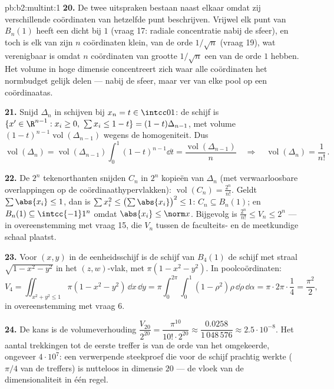 \begin{solution}{pb:b2:multint:1}
\textbf{20.} De twee uitspraken bestaan naast elkaar omdat zij
verschillende coördinaten van hetzelfde punt beschrijven. Vrijwel
elk punt van $B_n(1)$ heeft een  dicht bij $1$ (vraag 17:
radiale concentratie nabij de sfeer), en toch is elk van zijn $n$
coördinaten klein, van de orde $1/\sqrt n$ (vraag 19), wat
verenigbaar is omdat $n$ coördinaten van grootte $1/\sqrt n$ een
 van de orde $1$ hebben. Het volume in hoge dimensie
concentreert zich waar alle coördinaten het normbudget gelijk
delen --- nabij de sfeer, maar ver van elke pool op een
coördinaatas.

\textbf{21.} Snijd $\Delta_n$ in schijven bij $x_n = t \in
\intcc01$: de schijf is $\{x' \in \R^{n-1} : x_i \geq 0,\ \sum x_i
\leq 1 - t\} = (1-t)\Delta_{n-1}$, met volume
$(1-t)^{n-1}\operatorname{vol}(\Delta_{n-1})$ wegens de
homogeniteit. Dus
\[
\operatorname{vol}(\Delta_n) =
\operatorname{vol}(\Delta_{n-1})\int_0^1(1 - t)^{n-1}\dd t =
\frac{\operatorname{vol}(\Delta_{n-1})}{n}
\quad\Longrightarrow\quad
\operatorname{vol}(\Delta_n) = \frac1{n!}\,.
\]

\textbf{22.} De $2^n$ tekenorthanten snijden $C_n$ in $2^n$ kopieën
van $\Delta_n$ (met verwaarloosbare overlappingen op de
coördinaathypervlakken): $\operatorname{vol}(C_n) =
\frac{2^n}{n!}$. Geldt $\sum\abs{x_i} \leq 1$, dan is $\sum x_i^2
\leq \bigl(\sum\abs{x_i}\bigr)^2 \leq 1$: $C_n \subseteq B_n(1)$;
en $B_n(1) \subseteq \intcc{-1}1^n$ omdat $\abs{x_i} \leq \norm x$.
Bijgevolg is $\frac{2^n}{n!} \leq V_n \leq 2^n$ --- in
overeenstemming met vraag 15, die $V_n$ tussen de faculteits- en de
meetkundige schaal plaatst.

\textbf{23.} Voor $(x, y)$ in de eenheidsschijf is de schijf van
$B_4(1)$ de schijf met straal $\sqrt{1 - x^2 - y^2}$ in het $(z,
w)$-vlak, met  $\pi(1 - x^2 - y^2)$. In poolcoördinaten:
\[
V_4 = \iint_{x^2+y^2\leq1}\pi(1 - x^2 - y^2)\,\dd x\,\dd y
= \pi\int_0^{2\pi}\!\!\int_0^1(1 - \rho^2)\rho\,
\dd\rho\,\dd\alpha
= \pi\cdot2\pi\cdot\frac14 = \frac{\pi^2}2 ,
\]
in overeenstemming met vraag 6.

\textbf{24.} De kans is de volumeverhouding $\dfrac{V_{20}}{2^{20}}
= \dfrac{\pi^{10}}{10!\cdot2^{20}} \approx
\dfrac{0.0258}{1\,048\,576} \approx 2.5\cdot10^{-8}$. Het aantal
trekkingen tot de eerste treffer is van de orde van het omgekeerde,
ongeveer $4\cdot10^7$: een verwerpende steekproef die voor de
schijf prachtig werkte ($\pi/4$ van de treffers) is nutteloos in
dimensie $20$ --- de vloek van de dimensionaliteit in één regel.


\end{solution}

